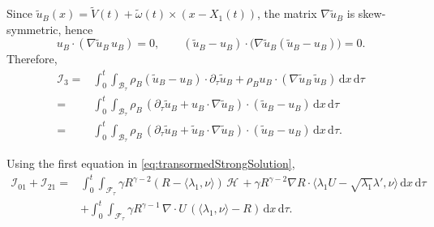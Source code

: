 \documentclass[11pt,twoside,reqno]{amsart}
\numberwithin{equation}{section}
\numberwithin{figure}{section}
\begin{document}
Since \(\tilde u_B(x)=\tilde V(t)+\tilde\omega(t)\times(x-X_1(t))\), the matrix \(\nabla\tilde u_B\) is skew-symmetric, hence
\begin{equation*}
    u_B\cdot(\nabla\tilde u_B\,u_B)=0, \qquad  (\tilde u_B-u_B)\cdot\big(\nabla\tilde u_B(\tilde u_B-u_B))=0.
\end{equation*}
 Therefore,
\begin{equation}\label{eq:I_3}
\begin{aligned}
\mathcal{I}_3
=&\int_0^t\!\!\int_{\mathcal{B}_\tau}\rho_B(\tilde u_B-u_B)\cdot \partial_\tau \tilde u_B
 +\rho_B u_B\cdot(\nabla\tilde u_B\,\tilde u_B)\,\mathrm{d}x\,\mathrm{d}\tau\\
=&\int_0^t\!\!\int_{\mathcal{B}_\tau}\rho_B\,(\partial_\tau \tilde u_B + u_B\cdot\nabla\tilde u_B)\cdot(\tilde u_B-u_B)\,\mathrm{d}x\,\mathrm{d}\tau\\
=&\int_0^t\!\!\int_{\mathcal{B}_\tau}\rho_B\,(\partial_\tau \tilde u_B + \tilde u_B\cdot\nabla\tilde u_B)\cdot(\tilde u_B-u_B)\,\mathrm{d}x\,\mathrm{d}\tau.
\end{aligned}
\end{equation}

Using the first equation in \eqref{eq:transormedStrongSolution},
\begin{equation}\label{eq:I_02}
\begin{aligned}
\mathcal{I}_{01}+\mathcal{I}_{21}
=&\int_0^t\!\!\int_{\mathcal{F}_\tau}\gamma R^{\gamma-2}(R-\langle\lambda_1,\nu\rangle)\,\mathcal{H}\,+\gamma R^{\gamma-2}\nabla R\cdot \langle\lambda_1U-\sqrt{\lambda_1}\lambda',\nu\rangle\,\mathrm{d}x\,\mathrm{d}\tau
 \\&+\int_0^t\!\!\int_{\mathcal{F}_\tau}\gamma R^{\gamma-1}\,\nabla\!\cdot U\,(\langle\lambda_1,\nu\rangle-R)\,\mathrm{d}x\,\mathrm{d}\tau.
\end{aligned}
\end{equation}
\end{document}
